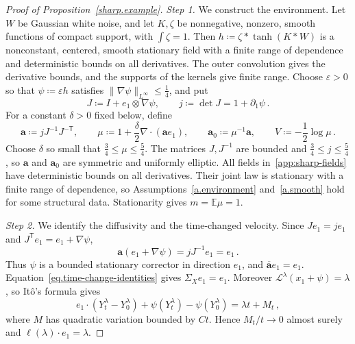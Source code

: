 \documentclass[11pt]{amsart}
\theoremstyle{definition}
\theoremstyle{remark}
\numberwithin{equation}{section}
\newcommand{\E}{\mathbb E}
\renewcommand{\a}{\mathbf a}
\newcommand{\ahom}{\overline{\mathbf a}}
\renewcommand{\epsilon}{\varepsilon}
\begin{document}
\begin{proof}[Proof of Proposition~\ref{sharp.example}]
\emph{Step 1.} We construct the environment. Let $W$ be Gaussian white noise, and let $K,\zeta$ be nonnegative, nonzero, smooth functions of compact support, with $\int\zeta=1$. Then $h\coloneqq\zeta*\tanh(K*W)$ is a nonconstant, centered, smooth stationary field with a finite range of dependence and deterministic bounds on all derivatives. The outer convolution gives the derivative bounds, and the supports of the kernels give finite range. Choose $\epsilon>0$ so that $\psi\coloneqq\epsilon h$ satisfies $\|\nabla\psi\|_{L^\infty}\leq\tfrac14$, and put
\begin{equation*}
 J\coloneqq I+e_1\otimes\nabla\psi,
 \qquad j\coloneqq\det J=1+\partial_1\psi\, .
\end{equation*}
For a constant $\delta>0$ fixed below, define
\begin{equation}\label{app:sharp-fields}
 \a\coloneqq jJ^{-1}J^{-\mathsf T},\qquad
 \mu\coloneqq1+\frac\delta2\nabla\cdot(\a e_1),\qquad
 \a_0\coloneqq\mu^{-1}\a,\qquad
 V\coloneqq-\frac12\log\mu\, .
\end{equation}
Choose $\delta$ so small that $\tfrac34\leq\mu\leq\tfrac54$. The matrices $J,J^{-1}$ are bounded and $\tfrac34\leq j\leq\tfrac54$, so $\a$ and $\a_0$ are symmetric and uniformly elliptic. All fields in~\eqref{app:sharp-fields} have deterministic bounds on all derivatives. Their joint law is stationary with a finite range of dependence, so Assumptions~\ref{a.environment} and~\ref{a.smooth} hold for some structural data. Stationarity gives $m=\E\mu=1$.

\emph{Step 2.} We identify the diffusivity and the time-changed velocity. Since $Je_1=je_1$ and $J^{\mathsf T}e_1=e_1+\nabla\psi$,
\begin{equation}\label{app:sharp-harmonic}
 \a(e_1+\nabla\psi)=jJ^{-1}e_1=e_1\, .
\end{equation}
Thus $\psi$ is a bounded stationary corrector in direction $e_1$, and $\ahom e_1=e_1$. Equation~\eqref{eq.time-change-identities} gives $\Sigma_Xe_1=e_1$. Moreover $\mathcal L^\lambda(x_1+\psi)=\lambda$, so It\^o's formula gives
\begin{equation*}
 e_1\cdot(Y^\lambda_t-Y^\lambda_0)+\psi(Y^\lambda_t)-\psi(Y^\lambda_0)
 =\lambda t+M_t\, ,
\end{equation*}
where $M$ has quadratic variation bounded by $Ct$. Hence $M_t/t\to0$ almost surely and $\ell(\lambda)\cdot e_1=\lambda$.


\end{proof}
\end{document}
